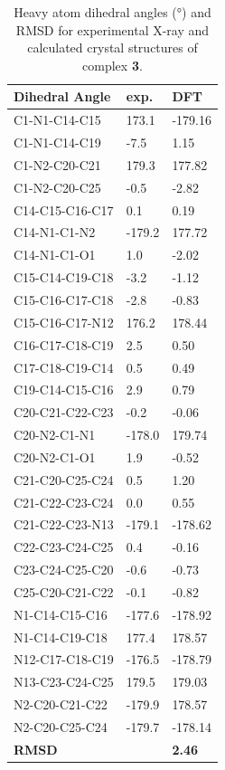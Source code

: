 \begin{table}[]
\centering
\caption{Heavy atom dihedral angles (°) and RMSD for experimental X-ray and calculated crystal structures of complex \textbf{3}.} \label{tab:dihedrals3}
\begin{tabular}{lll}
\textbf{Dihedral Angle} & \textbf{exp.} & \textbf{DFT} \\ \hline
C1-N1-C14-C15 & 173.1 & -179.16 \\
C1-N1-C14-C19 & -7.5 & 1.15 \\
C1-N2-C20-C21 & 179.3 & 177.82 \\
C1-N2-C20-C25 & -0.5 & -2.82 \\
C14-C15-C16-C17 & 0.1 & 0.19 \\
C14-N1-C1-N2 & -179.2 & 177.72 \\
C14-N1-C1-O1 & 1.0 & -2.02 \\
C15-C14-C19-C18 & -3.2 & -1.12 \\
C15-C16-C17-C18 & -2.8 & -0.83 \\
C15-C16-C17-N12 & 176.2 & 178.44 \\
C16-C17-C18-C19 & 2.5 & 0.50 \\
C17-C18-C19-C14 & 0.5 & 0.49 \\
C19-C14-C15-C16 & 2.9 & 0.79 \\
C20-C21-C22-C23 & -0.2 & -0.06 \\
C20-N2-C1-N1 & -178.0 & 179.74 \\
C20-N2-C1-O1 & 1.9 & -0.52 \\
C21-C20-C25-C24 & 0.5 & 1.20 \\
C21-C22-C23-C24 & 0.0 & 0.55 \\
C21-C22-C23-N13 & -179.1 & -178.62 \\
C22-C23-C24-C25 & 0.4 & -0.16 \\
C23-C24-C25-C20 & -0.6 & -0.73 \\
C25-C20-C21-C22 & -0.1 & -0.82 \\
N1-C14-C15-C16 & -177.6 & -178.92 \\
N1-C14-C19-C18 & 177.4 & 178.57 \\
N12-C17-C18-C19 & -176.5 & -178.79 \\
N13-C23-C24-C25 & 179.5 & 179.03 \\
N2-C20-C21-C22 & -179.9 & 178.57 \\
N2-C20-C25-C24 & -179.7 & -178.14 \\ \hline
\textbf{RMSD} & \textbf{} & \textbf{2.46}
\end{tabular}
\end{table}



